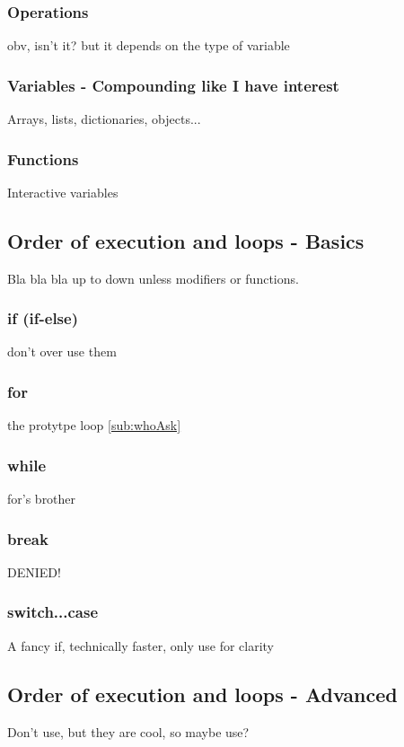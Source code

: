     \subsubsection{Operations}
    \label{subsub:operations}
obv, isn't it? but it depends on the type of variable
    \subsubsection{Variables - Compounding like I have interest} 
    \label{subsub:array}
Arrays, lists, dictionaries, objects...
    \subsubsection{Functions}
    \label{subsub:functions}
Interactive variables

\subsection{Order of execution and loops - Basics}
\label{sub:execBasic}
Bla bla bla up to down unless modifiers or functions.
    \subsubsection{if (if-else)}
    \label{subsub:if}
don't over use them

    \subsubsection{for}
    \label{subsub:for}
the protytpe loop \ref{sub:whoAsk}

    \subsubsection{while}
    \label{sub:while}
for's brother

    \subsubsection{break}
    \label{subsub:break}
DENIED!

    \subsubsection{switch...case}
    \label{subsub:switch}
A fancy if, technically faster, only use for clarity

\subsection{Order of execution and loops - Advanced}
\label{sub:execAdv}
Don't use, but they are cool, so maybe use?
